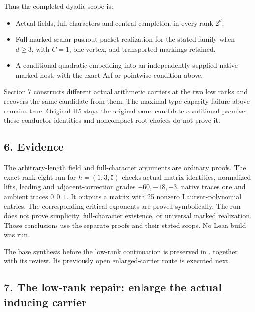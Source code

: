 Thus the completed dyadic scope is:

\begin{itemize}
\tightlist
\item
  Actual fields, full characters and central completion in every rank
  \(2^d\).
\item
  Full marked scalar-pushout packet realization for the stated family
  when \(d\ge3\), with \(C=1\), one vertex, and transported markings
  retained.
\item
  A conditional quadratic embedding into an independently supplied
  native marked host, with the exact Arf or pointwise condition above.
\end{itemize}

Section 7 constructs different actual arithmetic carriers at the two low
ranks and recovers the same candidate from them. The maximal-type
capacity failure above remains true. Original H5 stays the original
same-candidate conditional premise; these conductor identities and
noncompact root choices do not prove it.

\hypertarget{dyadic_synthesis-evidence}{%
\subsection{6. Evidence}\label{dyadic_synthesis-evidence}}

The arbitrary-length field and full-character arguments are ordinary
proofs. The exact rank-eight run for \(h=(1,3,5)\) checks actual matrix
identities, normalized lifts, leading and adjacent-correction grades
\(-60,-18,-3\), native traces one and ambient traces \(0,0,1\). It
outputs a matrix with 25 nonzero Laurent-polynomial entries. The
corresponding critical exponents are proved symbolically. The run does
not prove simplicity, full-character existence, or universal marked
realization. Those conclusions use the separate proofs and their stated
scope. No Lean build was run.

The base synthesis before the low-rank continuation is preserved in
, together with its
review. Its previously open enlarged-carrier route is executed next.

\hypertarget{dyadic_synthesis-the-low-rank-repair-enlarge-the-actual-inducing-carrier}{%
\subsection{7. The low-rank repair: enlarge the actual inducing
carrier}\label{dyadic_synthesis-the-low-rank-repair-enlarge-the-actual-inducing-carrier}}

